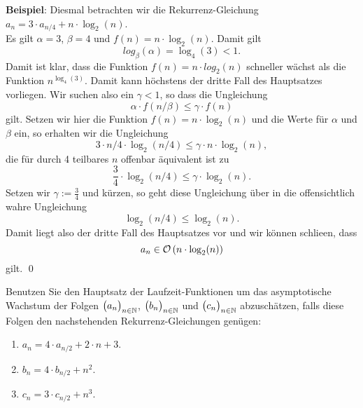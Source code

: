 \noindent
\textbf{Beispiel}:
Diesmal betrachten  wir die Rekurrenz-Gleichung 
\\[0.2cm]
\hspace*{1.3cm}
$a_n = 3 \cdot a_{n/4} + n \cdot \log_2(n)$.
\\[0.2cm]
Es gilt $\alpha = 3$, $\beta = 4$ und $f(n) = n \cdot \log_2(n)$.  Damit gilt
\[ log_\beta(\alpha) = \log_4(3) < 1. \]
Damit ist klar, dass die Funktion $f(n) = n \cdot log_2(n)$ schneller w\"achst als die
Funktion $n^{\log_4(3)}$.  Damit kann h\"ochstens der dritte Fall des Hauptsatzes vorliegen.
Wir suchen also ein $\gamma < 1$, so dass die Ungleichung
\[ \alpha \cdot f(n/\beta) \leq \gamma \cdot f(n) \]
gilt.  Setzen wir hier die Funktion $f(n) = n \cdot \log_2(n)$ und die Werte f\"ur $\alpha$
und $\beta$ ein, so erhalten wir die Ungleichung 
\[ 3 \cdot n/4 \cdot \log_2(n/4) \leq \gamma \cdot n \cdot \log_2(n), \]
die f\"ur durch 4 teilbares $n$ offenbar \"aquivalent ist zu
\[ \frac{3}{4} \cdot \log_2(n/4) \leq \gamma \cdot \log_2(n). \]
Setzen wir $\gamma := \frac{3}{4}$ und k\"urzen, so geht diese Ungleichung \"uber in die
offensichtlich wahre Ungleichung
\[ \log_2(n/4) \leq \log_2(n). \] 
Damit liegt also der dritte Fall des Hauptsatzes vor und wir k\"onnen schlie\3en, dass
\[ a_n \in \mathcal{O}\left(n \cdot \log_2(n)\right) \]
gilt. \qed
\vspace*{0.3cm}

\exercise
Benutzen Sie den Hauptsatz der Laufzeit-Funktionen um das asymptotische Wachstum 
der Folgen $\bigl(a_n\bigr)_{n\in\mathbb{N}}$, $\bigl(b_n\bigr)_{n\in\mathbb{N}}$ und $\bigl(c_n\bigr)_{n\in\mathbb{N}}$  abzusch\"atzen, falls diese
Folgen den nachstehenden Rekurrenz-Gleichungen gen\"ugen:
\begin{enumerate}
\item $a_n = 4 \cdot a_{n/2} + 2 \cdot n + 3$.
\item $b_n = 4 \cdot b_{n/2} + n^2$.
\item $c_n = 3 \cdot c_{n/2} + n^3$.
\end{enumerate}

